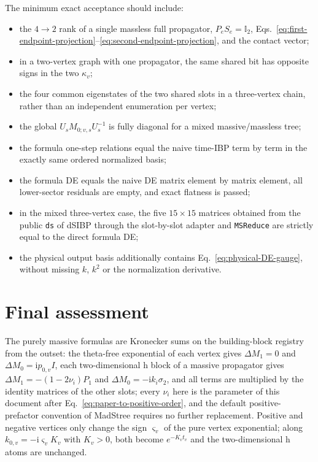 \documentclass[11pt,a4paper]{article}
\newcommand{\ii}{\mathrm i}
\newcommand{\Id}{\mathbb I}
\begin{document}
The minimum exact acceptance should include:
\begin{itemize}
  \item the $4\to2$ rank of a single massless full propagator, $P_eS_e=\Id_2$, Eqs.~\eqref{eq:first-endpoint-projection}--\eqref{eq:second-endpoint-projection}, and the contact vector;
  \item in a two-vertex graph with one propagator, the same shared bit has opposite signs in the two $\kappa_v$;
  \item the four common eigenstates of the two shared slots in a three-vertex chain, rather than an independent enumeration per vertex;
  \item the global $U_sM_{0;v,s}U_s^{-1}$ is fully diagonal for a mixed massive/massless tree;
  \item the formula one-step relations equal the naive time-IBP term by term in the exactly same ordered normalized basis;
  \item the formula DE equals the naive DE matrix element by matrix element, all lower-sector residuals are empty, and exact flatness is passed;
  \item in the mixed three-vertex case, the five $15\times15$ matrices obtained from the public \texttt{ds} of dSIBP through the slot-by-slot adapter and \texttt{MSReduce} are strictly equal to the direct formula DE;
  \item the physical output basis additionally contains Eq.~\eqref{eq:physical-DE-gauge}, without missing $k$, $k^2$ or the normalization derivative.
\end{itemize}

\section{Final assessment}

The purely massive formulas are Kronecker sums on the building-block registry from the outset: the theta-free exponential of each vertex gives $\Delta M_1=0$ and $\Delta M_0=\ii p_{0,v}I$, each two-dimensional h block of a massive propagator gives $\Delta M_1=-(1-2\nu_i)P_1$ and $\Delta M_0=-\ii k_i\sigma_2$, and all terms are multiplied by the identity matrices of the other slots; every $\nu_i$ here is the parameter of this document after Eq.~\eqref{eq:paper-to-positive-order}, and the default positive-prefactor convention of MadStree requires no further replacement. Positive and negative vertices only change the sign $\varsigma_v$ of the pure vertex exponential; along $k_{0,v}=-\ii\varsigma_vK_v$ with $K_v>0$, both become $e^{-K_vt_v}$ and the two-dimensional h atoms are unchanged.
\end{document}
